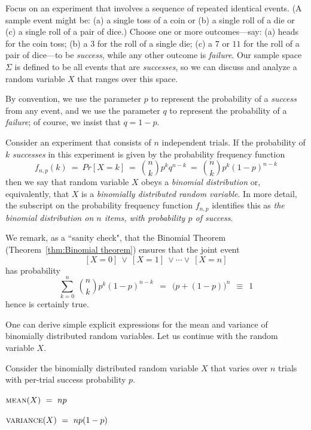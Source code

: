 Focus on an experiment that involves a sequence of repeated identical events.  (A sample event might be: (a) a single toss of a coin or (b) a single roll of a die or (c) a single roll of a pair of dice.)  Choose one or more outcomes---say: (a) {\sc heads} for the coin toss; (b) a $3$ for the roll of a single die; (c) a $7$ or $11$ for the roll of a pair of dice---to be {\em success}, while any other outcome is {\em failure}.  Our sample space $\Sigma$ is defined to be all events that are {\em successes}, so we can discuss and analyze a random variable $X$ that ranges over this space.

\smallskip

By convention, we use the parameter $p$ to represent the probability of a {\em success} from any event, and we use the parameter $q$ to represent the probability of a {\em failure}; of course, we insist that $q = 1-p$.

\smallskip

  
Consider an experiment that consists of $n$ independent trials.  If the probability of $k$ {\em successes} in this experiment is given by the probability frequency function
\begin{equation}
\label{eq:binomial-prob-freq}
f_{n,p}(k) \ = \ Pr[X=k] \ = \ {n \choose k} p^k q^{n-k} \ = \ {n \choose k} p^k (1-p)^{n-k}
\end{equation}
then we say that random variable $X$ obeys a {\em binomial distribution} or, equivalently, that $X$ is a {\em binomially distributed random variable}.  In more detail, the subscript on the probability frequency function $f_{n,p}$ identifies this as {\em the binomial distribution on $n$ items, with probability $p$ of success}.

\smallskip

We remark, as a ``sanity check", that the Binomial Theorem (Theorem~\ref{thm:Binomial theorem}) ensures that the joint event
\[ [X=0] \ \vee \ [X=1] \ \vee \cdots  \vee \ [X=n] \]
has probability
\[ \sum_{k=0}^n \ {n \choose k} p^k (1-p)^{n-k} \ \ = \ \  \big(p + (1-p) \big)^n \ \ \equiv \ \ 1 \] 
hence is certainly {\sc true}.

\bigskip

One can derive simple explicit expressions for the mean and variance of binomially distributed random variables.  Let us continue with the random variable $X$.

\begin{prop}
\label{thm:bin-vble-mean+variance}
Consider the binomially distributed random variable $X$ that varies over $n$ trials with per-trial success probability $p$.

\smallskip

 $\mbox{\sc mean}(X) \ = \ np$

\smallskip

 $\mbox{\sc variance}(X) \ = \ np(1-p)$
\end{prop}


